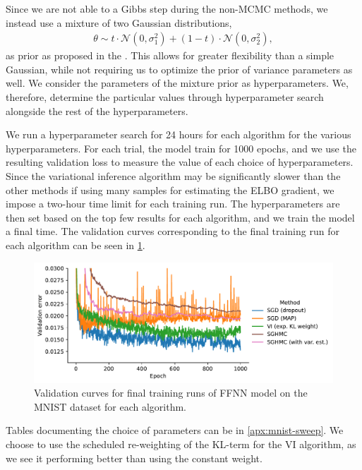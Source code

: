 Since we are not able to a Gibbs step during the non-MCMC methods, we instead use a mixture of two Gaussian distributions,
\begin{align}
    \theta \sim t\cdot \mathcal{N}(0, \sigma_1^2) + (1-t)\cdot \mathcal{N}(0, \sigma_2^2),
\end{align}
as prior as proposed in the \cite{blundell_weight_2015}.
This allows for greater flexibility than a simple Gaussian, while not requiring us to optimize the prior of variance parameters as well.
We consider the parameters of the mixture prior as hyperparameters.
We, therefore, determine the particular values through hyperparameter search alongside the rest of the hyperparameters.

We run a hyperparameter search for 24 hours for each algorithm for the various hyperparameters. 
For each trial, the model train for 1000 epochs, and we use the resulting validation loss to measure the value of each choice of hyperparameters.  
Since the variational inference algorithm may be significantly slower than the other methods if using many samples for estimating the ELBO gradient, we impose a two-hour time limit for each training run. 
The hyperparameters are then set based on the top few results for each algorithm, and we train the model a final time.
The validation curves corresponding to the final training run for each algorithm can be seen in \cref{fig:mnist-best-val-curves}.
\begin{figure}[htbp]
    \centering
    \includegraphics[width=\linewidth]{Figures/mnist-final-runs-val.pdf}
    \caption{Validation curves for final training runs of FFNN model on the MNIST dataset for each algorithm.}
    \label{fig:mnist-best-val-curves}
\end{figure}
Tables documenting the choice of parameters can be in \cref{apx:mnist-sweep}.
We choose to use the scheduled re-weighting of the KL-term for the VI algorithm, as we see it performing better than using the constant weight.

